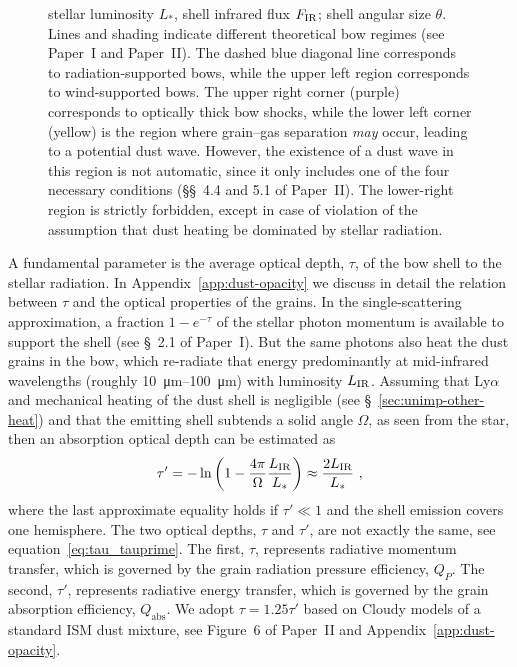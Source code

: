 \begin{figure}
{    stellar luminosity \(L_*\), shell infrared flux \(F_{\text{IR}}\); shell
    angular size \(\theta\).  Lines and shading indicate different
    theoretical bow regimes (see Paper~I and Paper~II).  The dashed
    blue diagonal line corresponds to radiation-supported bows, while
    the upper left region corresponds to wind-supported bows.  The
    upper right corner (purple) corresponds to optically thick bow
    shocks, while the lower left corner (yellow) is the region where
    grain--gas separation \textit{may} occur, leading to a potential
    dust wave.  However, the existence of a dust wave in this region
    is not automatic, since it only includes one of the four necessary
    conditions (\S\S~4.4 and 5.1 of Paper~II). The lower-right region
    is strictly forbidden, except in case of violation of the
    assumption that dust heating be dominated by stellar radiation. }
  \label{fig:All-sources-eta-tau}
\end{figure}


A fundamental parameter is the average optical depth, \(\tau\), of the
bow shell to the stellar radiation. In Appendix~\ref{app:dust-opacity}
we discuss in detail the relation between \(\tau\) and the optical
properties of the grains.  In the single-scattering approximation, a
fraction \(1 - e^{-\tau}\) of the stellar photon momentum is available to
support the shell (see \S~2.1 of Paper~I).  But the same photons also
heat the dust grains in the bow, which re-radiate that energy
predominantly at mid-infrared wavelengths (roughly
\SIrange{10}{100}{\um}) with luminosity \(L_{\text{IR}}\).  Assuming that
Ly\(\alpha\) and mechanical heating of the dust shell is negligible (see
\S~\ref{sec:unimp-other-heat}) and that the emitting shell subtends a
solid angle \(\Omega\), as seen from the star, then an absorption optical depth can
be estimated as
\begin{equation}
  \label{eq:tau-empirical}
  \tau' = -\ln \left( 1 - \frac{4\pi}{\Omega} \frac{L_{\text{IR}}}{L_*} \right)
  \approx \frac{2 L_{\text{IR}}}{L_*} \ ,
\end{equation}
where the last approximate equality holds if \(\tau' \ll 1\) and the shell
emission covers one hemisphere.  The two optical depths, \(\tau\) and
\(\tau'\), are not exactly the same, see
equation~\eqref{eq:tau_tauprime}.  The first, \(\tau\), represents
radiative momentum transfer, which is governed by the grain radiation
pressure efficiency, \(Q_P\).  The second, \(\tau'\), represents
radiative energy transfer, which is governed by the grain absorption
efficiency, \(Q_{\text{abs}}\).  We adopt \(\tau = 1.25 \tau'\) based on
Cloudy models of a standard ISM dust mixture, see Figure~6 of
Paper~II and Appendix~\ref{app:dust-opacity}.

